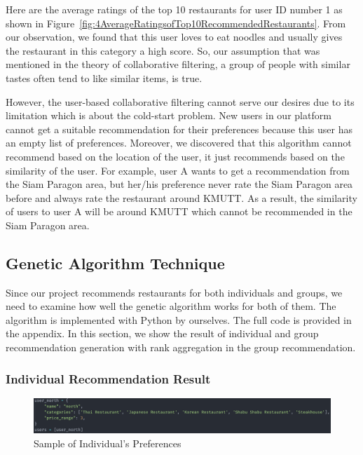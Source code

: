 \documentclass[12pt,oneside,openright,a4paper]{cpe-english-project}
\begin{document}
Here are the average ratings of the top 10 restaurants for user ID number 1 as shown in Figure~\ref{fig:4AverageRatingsofTop10RecommendedRestaurants}. From our observation, we found that this user loves to eat noodles and usually gives the restaurant in this category a high score. So, our assumption that was mentioned in the theory of collaborative filtering, a group of people with similar tastes often tend to like similar items, is true.

However, the user-based collaborative filtering cannot serve our desires due to its limitation which is about the cold-start problem. New users in our platform cannot get a suitable recommendation for their preferences because this user has an empty list of preferences. Moreover, we discovered that this algorithm cannot recommend based on the location of the user, it just recommends based on the similarity of the user. For example, user A wants to get a recommendation from the Siam Paragon area, but her/his preference never rate the Siam Paragon area before and always rate the restaurant around KMUTT. As a result, the similarity of users to user A will be around KMUTT which cannot be recommended in the Siam Paragon area.

\subsection{Genetic Algorithm Technique} \label{sec:ga}

Since our project recommends restaurants for both individuals and groups, we need to examine how well the genetic algorithm works for both of them. The algorithm is implemented with Python by ourselves. The full code is provided in the appendix. In this section, we show the result of individual and group recommendation generation with rank aggregation in the group recommendation.

\subsubsection{Individual Recommendation Result}


\begin{figure}[H]\centering
\includegraphics[width=350pt]{./images/4SampleofIndividualsPreferences.png}
\caption{Sample of Individual’s Preferences}\label{fig:4SampleofIndividualsPreferences}
\end{figure}\vspace{-24pt}
\end{document}
